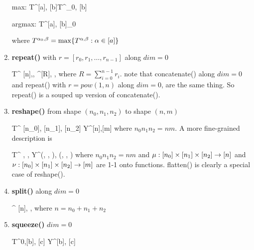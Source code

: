 \begin{enumerate}
\beq
{\rm max:}\;\; T^{[a], [b]}\rarrow T^{\alp_0, [b]}
\eeq

\beq
{\rm argmax:}\;\; T^{[a], [b]}\rarrow \alp_0
\eeq

where $T^{\alpha_0, \beta}=\max\{T^{\alpha, \beta}: \alpha\in[a]\}$



\item {\bf repeat()} with $r=[r_0, r_1, \ldots, r_{n-1}]$
along $dim=0$

\beq
T^{
[n],\beta, \gamma}\rarrow
{}^{[R], \beta, \gamma}
\eeq
where $R=\sum_{i=0}^{n-1}r_i$.
note that concatenate() along $dim=0$ and repeat()
 with $r=pow(1, n)$
along $dim=0$, are the same thing. So repeat() is a
souped up version of concatenate().


\item {\bf reshape()} from shape
$(n_0, n_1, n_2)$ to shape $(n,m)$

\beq
T^{
[n_0],
[n_1],
[n_2]}
\rarrow
Y^{[n],[m]}
\eeq
where
$n_0n_1n_2=nm$. A more fine-grained description is

\beq
T^{
\alpha,
\beta,
\gamma}
\rarrow
Y^{\mu(\alpha, \beta, \gamma),
\nu(\alpha, \beta, \gamma)}
\eeq
where $n_0n_1n_2=nm$ and
$\mu:[n_0]\times[n_1]\times[n_2]\rightarrow [n]$
and
$\nu:[n_0]\times[n_1]\times[n_2]\rightarrow [m]$
are 1-1 onto functions.
flatten() is clearly a special case of reshape().


\item {\bf split()} along $dim=0$

\beq
{}^{
[n], \beta, \gamma}
\eeq
where $n= n_0 + n_1 + n_2$




\item {\bf squeeze()} $dim=0$

\beq
T^{0,[b], [c]}
\rarrow
Y^{[b], [c]}
\eeq


\end{enumerate}
